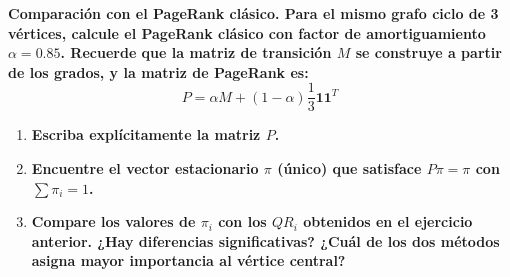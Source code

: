 {\bfseries Comparación con el PageRank clásico. 
Para el mismo grafo ciclo de 3 vértices, calcule el PageRank clásico con factor de amortiguamiento $\alpha=0.85$. 
Recuerde que la matriz de transición $M$ se construye a partir de los grados, y la matriz de PageRank es: 
\begin{equation*}
P=\alpha M+(1-\alpha)\frac{1}{3}\mathbf{1}\mathbf{1}^{T}
\end{equation*}}

\begin{enumerate}
    \item[a)] {\bfseries Escriba explícitamente la matriz $P$.}
    \item[b)] {\bfseries Encuentre el vector estacionario $\pi$ (único) que satisface $P\pi=\pi$ con $\sum \pi_{i}=1$.}
    \item[c)] {\bfseries Compare los valores de $\pi_{i}$ con los $QR_{i}$ obtenidos en el ejercicio anterior. ¿Hay diferencias significativas? ¿Cuál de los dos métodos asigna mayor importancia al vértice central?}
\end{enumerate}

